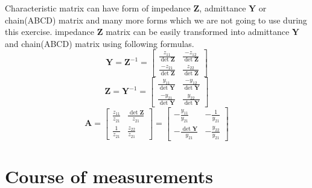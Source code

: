 \documentclass[notitlepage, a4paper, 11pt]{article}
\begin{document}
	Characteristic matrix can have form of impedance $\mathbf{Z}$, admittance $\mathbf{Y}$ or chain(ABCD) matrix and many more forms which we are not going to use during this exercise.	
	impedance $\mathbf{Z}$ matrix can be easily transformed into admittance $\mathbf{Y}$ and chain(ABCD) matrix using following formulas.
	\begin{equation}\label{eq:ZtoY}
		\mathbf{Y} = \mathbf{Z}^{-1} = 
		\begin{bmatrix}
			\frac{z_{11}}{\det\mathbf{Z}} & \frac{-z_{12}}{\det\mathbf{Z}} \\[4pt]
			\frac{-z_{21}}{\det\mathbf{Z}} & \frac{z_{22}}{\det\mathbf{Z}}
		\end{bmatrix}
	\end{equation}
	\begin{equation}\label{eq:YtoZ}
		\mathbf{Z} = \mathbf{Y}^{-1} = 
		\begin{bmatrix}
			\frac{y_{11}}{\det\mathbf{Y}} & \frac{-y_{12}}{\det\mathbf{Y}} \\[4pt]
			\frac{-y_{21}}{\det\mathbf{Y}} & \frac{y_{22}}{\det\mathbf{Y}}
		\end{bmatrix}
	\end{equation}
	\begin{equation}\label{eq:toA}
		\mathbf{A} =
		\begin{bmatrix}
			\frac{z_{11}}{z_{21}} & \frac{\det \mathbf{Z}}{z_{21}} \\[4pt]
			\frac{1}{z_{21}} & \frac{z_{22}}{z_{21}}
		\end{bmatrix}
		=
		\begin{bmatrix}
			-\frac{y_{11}}{y_{21}} & -\frac{1}{y_{21}} \\[4pt]
			-\frac{\det \mathbf{Y}}{y_{21}} & -\frac{y_{22}}{y_{21}}
		\end{bmatrix}
	\end{equation}

	
	\section{Course of measurements}  
	
\end{document}
